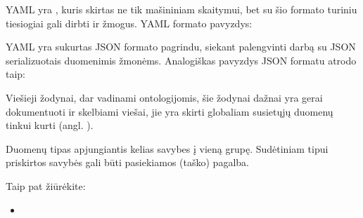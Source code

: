 \documentclass[letterpaper,10pt,lithuanian]{sphinxmanual}
\begin{document}
\begin{description}
\sphinxAtStartPar
YAML yra {\hyperref[\detokenize{savokos:term-duomenu-serializavimo-formatas}]{}}, kuris skirtas ne tik
mašininiam skaitymui, bet su šio formato turiniu tiesiogiai gali dirbti
ir žmogus. YAML formato pavyzdys:

\begin{sphinxVerbatim}[commandchars=\\\{\}]
\end{sphinxVerbatim}

\sphinxAtStartPar
YAML yra sukurtas JSON formato pagrindu, siekant palengvinti darbą su
JSON serializuotais duomenimis žmonėms. Analogiškas pavyzdys JSON formatu
atrodo taip:

\begin{sphinxVerbatim}[commandchars=\\\{\}]
\end{sphinxVerbatim}

\sphinxAtStartPar
Viešieji žodynai, dar vadinami ontologijomis, šie žodynai dažnai yra
gerai dokumentuoti ir skelbiami viešai, jie yra skirti globaliam
susietųjų duomenų tinkui kurti (angl. ).

\sphinxAtStartPar
Duomenų tipas apjungiantis kelias savybes į vieną grupę. Sudėtiniam
tipui priskirtos savybės gali būti pasiekiamos  (taško) pagalba.


\begin{sphinxseealso}{Taip pat žiūrėkite:}
\begin{itemize}
\item {} 
\sphinxAtStartPar
{\hyperref[\detokenize{tipai:type.ref}]{}}


\end{itemize}
\end{sphinxseealso}
\end{description}
\end{document}
